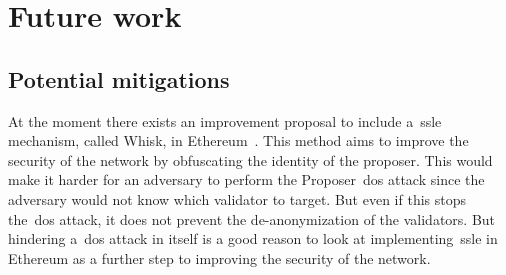 

\section{Future work}\label{sec:future-works}

\subsection{Potential mitigations}\label{subsec:potential-mitigations}
At the moment there exists an improvement proposal
to include a~\gls{ssle} mechanism, called Whisk, in Ethereum~\cite{EthereumResearchSSLE2024}.
This method aims to improve the security of the network by obfuscating the identity of the proposer.
This would make it harder
for an adversary to perform the Proposer~\gls{dos} attack since the adversary would not know which validator to target.
But even if this stops the~\gls{dos} attack, it does not prevent the de-anonymization of the validators.
But hindering a~\gls{dos} attack in itself is a good reason
to look at implementing~\gls{ssle} in Ethereum as a further step to improving the security of the network.

